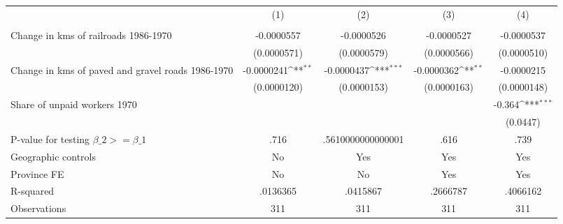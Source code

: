 {
\def\sym#1{\ifmmode^{#1}\else\(^{#1}\)\fi}
\begin{tabular}{l*{4}{c}}
\hline\hline
                &\multicolumn{1}{c}{(1)}&\multicolumn{1}{c}{(2)}&\multicolumn{1}{c}{(3)}&\multicolumn{1}{c}{(4)}\\
                &\multicolumn{1}{c}{}&\multicolumn{1}{c}{}&\multicolumn{1}{c}{}&\multicolumn{1}{c}{}\\
\hline
Change in kms of railroads 1986-1970&-0.0000557         &-0.0000526         &-0.0000527         &-0.0000537         \\
                &(0.0000571)         &(0.0000579)         &(0.0000566)         &(0.0000510)         \\
[1em]
Change in kms of paved and gravel roads 1986-1970&-0.0000241\sym{**} &-0.0000437\sym{***}&-0.0000362\sym{**} &-0.0000215         \\
                &(0.0000120)         &(0.0000153)         &(0.0000163)         &(0.0000148)         \\
[1em]
Share of unpaid workers 1970&                  &                  &                  &   -0.364\sym{***}\\
                &                  &                  &                  & (0.0447)         \\
\hline
P-value for testing $\beta\_{2} >= \beta\_{1}$&     .716         &.5610000000000001         &     .616         &     .739         \\
Geographic controls&       No         &      Yes         &      Yes         &      Yes         \\
Province FE     &       No         &       No         &      Yes         &      Yes         \\
R-squared       & .0136365         & .0415867         & .2666787         & .4066162         \\
Observations    &      311         &      311         &      311         &      311         \\
\hline\hline
\end{tabular}
}
